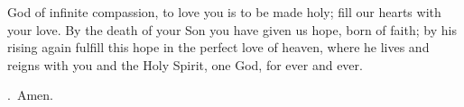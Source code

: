 \lettrine[lines=3]{G}{}od of infinite compassion,
to love you is to be made holy;
fill our hearts with your love.
By the death of your Son
you have given us hope, born of faith;
by his rising again
fulfill this hope
in the perfect love of heaven,
where he lives and reigns with you and the Holy Spirit,
one God, for ever and ever. \par \Rbar.~Amen.
